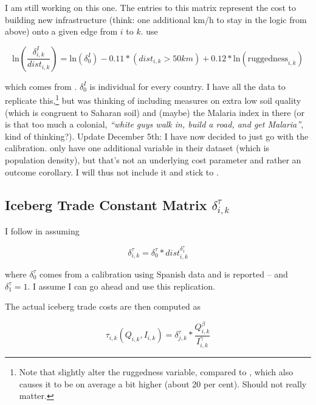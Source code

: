 \documentclass[11pt, oneside]{article}   	%
\begin{document}
I am still working on this one. The entries to this matrix represent the cost to building new infrastructure (think: one additional km/h to stay in the logic from above) onto a given edge from $i$ to $k$. \citeauthor{fajgelbaum_optimal_2017} use

\begin{equation}
  \textrm{ln}(\frac{\delta^{I}_{i,k}}{dist_{i,k}}) = \textrm{ln}(\delta_{0}^{I}) - 0.11*(dist_{i,k} > 50km) + 0.12*\textrm{ln}(\textrm{ruggedness}_{i,k})
\end{equation}

which comes from \cite{collier_cost_2015}. $\delta_{0}^{I}$ is individual for every country. I have all the data to replicate this,\footnote{Note that \citeauthor{henderson_global_2018} slightly alter the ruggedness variable, compared to \cite{nunn_ruggedness:_2012}, which also causes it to be on average a bit higher (about 20 per cent). Should not really matter.} but was thinking of including measures on extra low soil quality (which is congruent to Saharan soil) and (maybe) the Malaria index in there (or is that too much a colonial, \textit{``white guys walk in, build a road, and get Malaria''}, kind of thinking?). Update December 5th: I have now decided to just go with the \citeauthor{fajgelbaum_optimal_2017} calibration. \cite{collier_cost_2015} only have one additional variable in their dataset (which is population density), but that's not an underlying cost parameter and rather an outcome corollary. I will thus not include it and stick to \citeauthor{fajgelbaum_optimal_2017}.

\subsection{Iceberg Trade Constant Matrix $\delta^{\tau}_{i,k}$}

I follow \citeauthor{fajgelbaum_optimal_2017} in assuming

\begin{equation}
  \delta^{\tau}_{i,k} = \delta^{\tau}_{0} * dist_{i, k}^{\delta^{\tau}_{1}}
\end{equation}

where $\delta^{\tau}_{0}$ comes from a calibration using Spanish data and is reported -- and $\delta^{\tau}_{1} = 1$. I assume I can go ahead and use this replication.

The actual iceberg trade costs are then computed as

\begin{equation}
  \tau_{i,k}(Q_{i,k}, I_{i,k}) = \delta^{\tau}_{j, k} * \frac{Q_{i,k}^{\beta}}{I_{i,k}^{\gamma}}
\end{equation}
\end{document}
